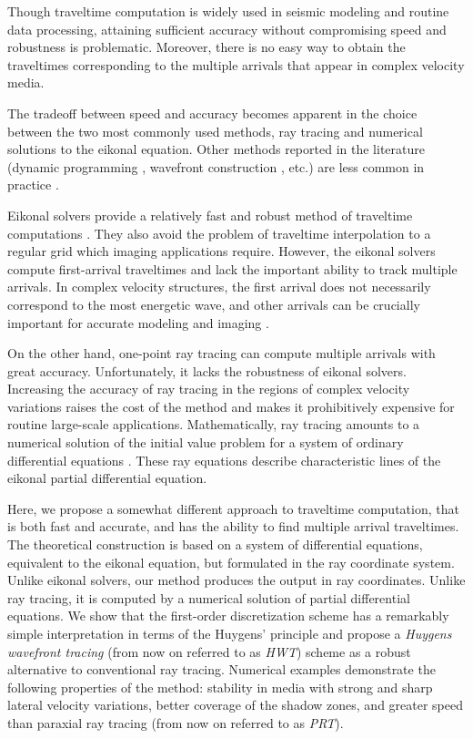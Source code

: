 Though traveltime computation is widely used in seismic modeling and
routine data processing, attaining sufficient accuracy without compromising
speed and robustness is problematic. Moreover, there is no easy way to
obtain the traveltimes corresponding to the multiple arrivals that appear
in complex velocity media.
\par
The tradeoff between speed and accuracy becomes apparent in the choice
between the two most commonly used methods, ray tracing and numerical
solutions to the eikonal equation. Other methods reported in the literature
(dynamic programming \cite{GEO56.01.00590067}, wavefront construction
\cite{GEO58.8..11571166}, etc.) are less common in practice
\cite{Audebert.sep.80.25}.
\par
Eikonal solvers provide a relatively fast and robust method of traveltime
computations \cite{GEO55.05.05210526,GEO56.06.08120821}. They also avoid
the problem of traveltime interpolation to a regular grid which imaging
applications require. However, the eikonal solvers compute first-arrival
traveltimes and lack the important ability to track multiple arrivals. In
complex velocity structures, the first arrival does not necessarily
correspond to the most energetic wave, and other arrivals can be crucially
important for accurate modeling and imaging \cite{fa,km}.
\par
On the other hand, one-point ray tracing can compute multiple arrivals
with great accuracy. Unfortunately, it lacks the robustness of eikonal
solvers. Increasing the accuracy of ray tracing in the regions of
complex velocity variations raises the cost of the method and makes
it prohibitively expensive for routine large-scale applications.
Mathematically, ray tracing amounts to a numerical solution of the
initial value problem for a system of ordinary differential equations
\cite{Cerveny.SeiTom.99.87}.  These ray equations describe
characteristic lines of the eikonal partial differential equation.
\par
Here, we propose a somewhat different approach to traveltime computation,
that is both fast and accurate, and has the ability to find multiple
arrival traveltimes. The theoretical construction is based on a system of
differential equations, equivalent to the eikonal equation, but formulated
in the ray coordinate system. Unlike eikonal solvers, our method produces
the output in ray coordinates. Unlike ray tracing, it is computed by a
numerical solution of partial differential equations. We show that the
first-order discretization scheme has a remarkably simple interpretation in
terms of the Huygens' principle and propose a \emph{Huygens wavefront
tracing} (from now on referred to as \emph{HWT}) scheme as a robust
alternative to conventional ray tracing. Numerical examples demonstrate the
following properties of the method: stability in media with strong and
sharp lateral velocity variations, better coverage of the shadow zones, and
greater speed than paraxial ray tracing (from now on referred to as
\emph{PRT}).

